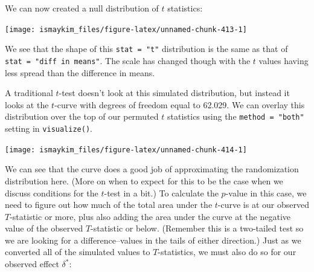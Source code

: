 \documentclass[12pt,]{krantz}
\makeatletter
\newenvironment{Shaded}{\begin{snugshade}}{\end{snugshade}}
\newcommand{\KeywordTok}[1]{\textcolor[rgb]{0.27,0.27,0.27}{\textbf{#1}}}
\newcommand{\DataTypeTok}[1]{\textcolor[rgb]{0.27,0.27,0.27}{#1}}
\newcommand{\StringTok}[1]{\textcolor[rgb]{0.5,0.5,0.5}{#1}}
\newcommand{\OperatorTok}[1]{\textcolor[rgb]{0.43,0.43,0.43}{\textbf{#1}}}
\newcommand{\NormalTok}[1]{#1}
\newenvironment{kframe}{%
\medskip{}
\setlength{\fboxsep}{.8em}
 \def\at@end@of@kframe{}%
 \ifinner\ifhmode%
  \def\at@end@of@kframe{\end{minipage}}%
  \begin{minipage}{\columnwidth}%
 \fi\fi%
 \def\FrameCommand##1{\hskip\@totalleftmargin \hskip-\fboxsep
 \colorbox{shadecolor}{##1}\hskip-\fboxsep
     \hskip-\linewidth \hskip-\@totalleftmargin \hskip\columnwidth}%
 \MakeFramed {\advance\hsize-\width
   \@totalleftmargin\z@ \linewidth\hsize
   \@setminipage}}%
 {\par\unskip\endMakeFramed%
 \at@end@of@kframe}
\renewenvironment{Shaded}{\begin{kframe}}{\end{kframe}}
\theoremstyle{definition}
\theoremstyle{definition}
\theoremstyle{definition}
\theoremstyle{remark}
\makeatother
\begin{document}
We can now created a null distribution of \(t\) statistics:

\begin{Shaded}
\end{Shaded}

\begin{center}\texttt{[image: ismaykim\_files/figure-latex/unnamed-chunk-413-1]} \end{center}

We see that the shape of this \texttt{stat\ =\ "t"} distribution is the
same as that of \texttt{stat\ =\ "diff\ in\ means"}. The scale has
changed though with the \(t\) values having less spread than the
difference in means.

A traditional \(t\)-test doesn't look at this simulated distribution,
but instead it looks at the \(t\)-curve with degrees of freedom equal to
62.029. We can overlay this distribution over the top of our permuted
\(t\) statistics using the \texttt{method\ =\ "both"} setting in
\texttt{visualize()}.

\begin{Shaded}
\end{Shaded}

\begin{center}\texttt{[image: ismaykim\_files/figure-latex/unnamed-chunk-414-1]} \end{center}

We can see that the curve does a good job of approximating the
randomization distribution here. (More on when to expect for this to be
the case when we discuss conditions for the \(t\)-test in a bit.) To
calculate the \(p\)-value in this case, we need to figure out how much
of the total area under the \(t\)-curve is at our observed
\(T\)-statistic or more, plus also adding the area under the curve at
the negative value of the observed \(T\)-statistic or below. (Remember
this is a two-tailed test so we are looking for a difference--values in
the tails of either direction.) Just as we converted all of the
simulated values to \(T\)-statistics, we must also do so for our
observed effect \(\delta^*\):
\end{document}
